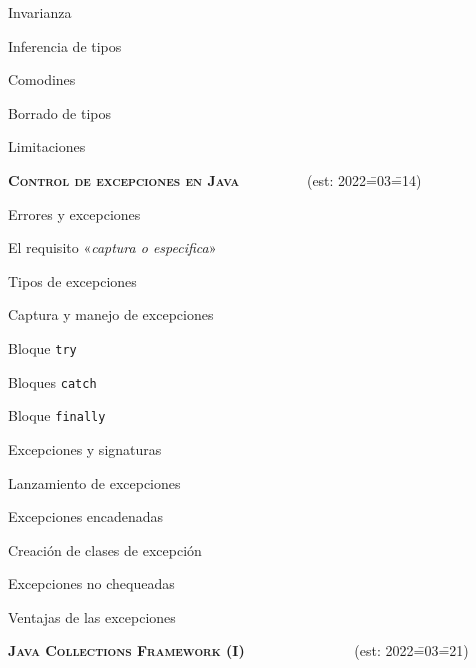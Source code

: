 \begin{longenum}
\begin{longenum}
\begin{longenum}
\begin{longenum}
                \item Invarianza
            \end{longenum}
        \end{longenum}
        \item Inferencia de tipos
        \item Comodines
        \item Borrado de tipos
        \item Limitaciones
    \end{longenum}
    \item \textbf{\textsc{Control de excepciones en Java}} \ \ \ \ \ \ \ \ \ (est: 2022\==03\==14)
    \begin{longenum}
        \item Errores y excepciones
        \item El requisito «\textit{captura o especifica}»
        \begin{longenum}
            \item Tipos de excepciones
        \end{longenum}
        \item Captura y manejo de excepciones
        \begin{longenum}
            \item Bloque \texttt{try}
            \item Bloques \texttt{catch}
            \item Bloque \texttt{finally}
        \end{longenum}
        \item Excepciones y signaturas
        \item Lanzamiento de excepciones
        \begin{longenum}
            \item Excepciones encadenadas
            \item Creación de clases de excepción
        \end{longenum}
        \item Excepciones no chequeadas
        \item Ventajas de las excepciones
    \end{longenum}
    \item \textbf{\textsc{Java Collections Framework (I)}} \ \ \ \ \ \ \ \ \ \ \ \ \ \ \ (est: 2022\==03\==21)
    \begin{longenum}

\end{longenum}
\end{longenum}
